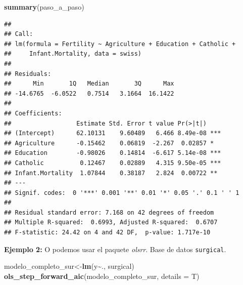 \documentclass[
]{book}
\newenvironment{Shaded}{\begin{snugshade}}{\end{snugshade}}
\newcommand{\AttributeTok}[1]{\textcolor[rgb]{0.13,0.29,0.53}{#1}}
\newcommand{\FunctionTok}[1]{\textcolor[rgb]{0.13,0.29,0.53}{\textbf{#1}}}
\newcommand{\NormalTok}[1]{#1}
\newcommand{\OtherTok}[1]{\textcolor[rgb]{0.56,0.35,0.01}{#1}}
\newcommand{\SpecialCharTok}[1]{\textcolor[rgb]{0.81,0.36,0.00}{\textbf{#1}}}
\begin{document}
\begin{Shaded}
\begin{Highlighting}[]
\FunctionTok{summary}\NormalTok{(paso\_a\_paso)}
\end{Highlighting}
\end{Shaded}

\begin{verbatim}
## 
## Call:
## lm(formula = Fertility ~ Agriculture + Education + Catholic + 
##     Infant.Mortality, data = swiss)
## 
## Residuals:
##      Min       1Q   Median       3Q      Max 
## -14.6765  -6.0522   0.7514   3.1664  16.1422 
## 
## Coefficients:
##                  Estimate Std. Error t value Pr(>|t|)    
## (Intercept)      62.10131    9.60489   6.466 8.49e-08 ***
## Agriculture      -0.15462    0.06819  -2.267  0.02857 *  
## Education        -0.98026    0.14814  -6.617 5.14e-08 ***
## Catholic          0.12467    0.02889   4.315 9.50e-05 ***
## Infant.Mortality  1.07844    0.38187   2.824  0.00722 ** 
## ---
## Signif. codes:  0 '***' 0.001 '**' 0.01 '*' 0.05 '.' 0.1 ' ' 1
## 
## Residual standard error: 7.168 on 42 degrees of freedom
## Multiple R-squared:  0.6993, Adjusted R-squared:  0.6707 
## F-statistic: 24.42 on 4 and 42 DF,  p-value: 1.717e-10
\end{verbatim}

\textbf{Ejemplo 2:} O podemos usar el paquete \emph{olsrr}. Base de datos \texttt{surgical}.

\begin{Shaded}
\begin{Highlighting}[]
\NormalTok{modelo\_completo\_sur}\OtherTok{\textless{}{-}}\FunctionTok{lm}\NormalTok{(y}\SpecialCharTok{\textasciitilde{}}\NormalTok{., surgical)}
\FunctionTok{ols\_step\_forward\_aic}\NormalTok{(modelo\_completo\_sur, }\AttributeTok{details =}\NormalTok{ T)}
\end{Highlighting}
\end{Shaded}
\end{document}
